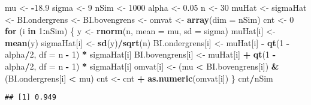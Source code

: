 \documentclass[12pt,dutch,coursenotes]{book}
\newenvironment{Shaded}{\begin{snugshade}}{\end{snugshade}}
\newcommand{\KeywordTok}[1]{\textcolor[rgb]{0.13,0.29,0.53}{\textbf{#1}}}
\newcommand{\DataTypeTok}[1]{\textcolor[rgb]{0.13,0.29,0.53}{#1}}
\newcommand{\DecValTok}[1]{\textcolor[rgb]{0.00,0.00,0.81}{#1}}
\newcommand{\FloatTok}[1]{\textcolor[rgb]{0.00,0.00,0.81}{#1}}
\newcommand{\StringTok}[1]{\textcolor[rgb]{0.31,0.60,0.02}{#1}}
\newcommand{\ControlFlowTok}[1]{\textcolor[rgb]{0.13,0.29,0.53}{\textbf{#1}}}
\newcommand{\OperatorTok}[1]{\textcolor[rgb]{0.81,0.36,0.00}{\textbf{#1}}}
\newcommand{\NormalTok}[1]{#1}
\theoremstyle{definition}
\theoremstyle{definition}
\theoremstyle{definition}
\theoremstyle{remark}
\begin{document}
\begin{Shaded}
\begin{Highlighting}[]
\NormalTok{mu <-}\StringTok{ }\OperatorTok{-}\FloatTok{18.9}
\NormalTok{sigma <-}\StringTok{ }\DecValTok{9}
\NormalTok{nSim <-}\StringTok{ }\DecValTok{1000}
\NormalTok{alpha <-}\StringTok{ }\FloatTok{0.05}
\NormalTok{n <-}\StringTok{ }\DecValTok{30}
\NormalTok{muHat <-}\StringTok{ }\NormalTok{sigmaHat <-}\StringTok{ }\NormalTok{BI.ondergrens <-}\StringTok{ }\NormalTok{BI.bovengrens <-}\StringTok{ }\NormalTok{omvat <-}\StringTok{ }\KeywordTok{array}\NormalTok{(}\DataTypeTok{dim =}\NormalTok{ nSim)}
\NormalTok{cnt <-}\StringTok{ }\DecValTok{0}
\ControlFlowTok{for}\NormalTok{ (i }\ControlFlowTok{in} \DecValTok{1}\OperatorTok{:}\NormalTok{nSim) \{}
\NormalTok{    y <-}\StringTok{ }\KeywordTok{rnorm}\NormalTok{(n, }\DataTypeTok{mean =}\NormalTok{ mu, }\DataTypeTok{sd =}\NormalTok{ sigma)}
\NormalTok{    muHat[i] <-}\StringTok{ }\KeywordTok{mean}\NormalTok{(y)}
\NormalTok{    sigmaHat[i] <-}\StringTok{ }\KeywordTok{sd}\NormalTok{(y)}\OperatorTok{/}\KeywordTok{sqrt}\NormalTok{(n)}
\NormalTok{    BI.ondergrens[i] <-}\StringTok{ }\NormalTok{muHat[i] }\OperatorTok{-}\StringTok{ }\KeywordTok{qt}\NormalTok{(}\DecValTok{1} \OperatorTok{-}\StringTok{ }\NormalTok{alpha}\OperatorTok{/}\DecValTok{2}\NormalTok{, }
        \DataTypeTok{df =}\NormalTok{ n }\OperatorTok{-}\StringTok{ }\DecValTok{1}\NormalTok{) }\OperatorTok{*}\StringTok{ }\NormalTok{sigmaHat[i]}
\NormalTok{    BI.bovengrens[i] <-}\StringTok{ }\NormalTok{muHat[i] }\OperatorTok{+}\StringTok{ }\KeywordTok{qt}\NormalTok{(}\DecValTok{1} \OperatorTok{-}\StringTok{ }\NormalTok{alpha}\OperatorTok{/}\DecValTok{2}\NormalTok{, }
        \DataTypeTok{df =}\NormalTok{ n }\OperatorTok{-}\StringTok{ }\DecValTok{1}\NormalTok{) }\OperatorTok{*}\StringTok{ }\NormalTok{sigmaHat[i]}
\NormalTok{    omvat[i] <-}\StringTok{ }\NormalTok{(mu }\OperatorTok{<}\StringTok{ }\NormalTok{BI.bovengrens[i]) }\OperatorTok{&}\StringTok{ }\NormalTok{(BI.ondergrens[i] }\OperatorTok{<}\StringTok{ }
\StringTok{        }\NormalTok{mu)}
\NormalTok{    cnt <-}\StringTok{ }\NormalTok{cnt }\OperatorTok{+}\StringTok{ }\KeywordTok{as.numeric}\NormalTok{(omvat[i])}
\NormalTok{\}}
\NormalTok{cnt}\OperatorTok{/}\NormalTok{nSim}
\end{Highlighting}
\end{Shaded}

\begin{verbatim}
## [1] 0.949
\end{verbatim}
\end{document}
